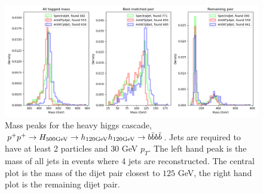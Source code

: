 \begin{figure}[htp]
    \includegraphics[width=1.\textwidth]{graphics/show2_125.png}
    \caption{Mass peaks for the heavy higgs cascade,
    \(p^+ p^+ \rightarrow H_{500\text{GeV}} \rightarrow h_{120\text{GeV}} h_{120\text{GeV}} \rightarrow b \bar{b} b \bar{b}\).
        Jets are required to have at least 2 particles and \(30\) GeV \(p_T\).
        The left hand peak is the mass of all jets in events where 4 jets are reconstructed.
        The central plot is the mass of the dijet pair closest to \(125\) GeV,
        the right hand plot is the remaining dijet pair.
    }
\end{figure}    
%        
%        
